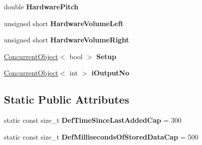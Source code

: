 \begin{DoxyCompactItemize}
\item 
\hypertarget{classcl_output_device_af51b846d3b4a11da3eefa8ccc4606132}{
double {\bfseries HardwarePitch}}
\label{classcl_output_device_af51b846d3b4a11da3eefa8ccc4606132}

\item 
\hypertarget{classcl_output_device_a12e78eba45422f2435aa0882eee979ac}{
unsigned short {\bfseries HardwareVolumeLeft}}
\label{classcl_output_device_a12e78eba45422f2435aa0882eee979ac}

\item 
\hypertarget{classcl_output_device_a1ff9989367b80682c33c815e548b206a}{
unsigned short {\bfseries HardwareVolumeRight}}
\label{classcl_output_device_a1ff9989367b80682c33c815e548b206a}

\item 
\hypertarget{classcl_output_device_a13d39a4d2d8782de9e849e0da0c48f0a}{
\hyperlink{class_concurrent_object}{ConcurrentObject}$<$ bool $>$ {\bfseries Setup}}
\label{classcl_output_device_a13d39a4d2d8782de9e849e0da0c48f0a}

\item 
\hypertarget{classcl_output_device_a7fccddb644e682c7e206118fedff60e5}{
\hyperlink{class_concurrent_object}{ConcurrentObject}$<$ int $>$ {\bfseries iOutputNo}}
\label{classcl_output_device_a7fccddb644e682c7e206118fedff60e5}

\end{DoxyCompactItemize}
\subsection*{Static Public Attributes}
\begin{DoxyCompactItemize}
\item 
\hypertarget{classcl_output_device_a6f4d941032e422926213833b01bfe08b}{
static const size\_\-t {\bfseries DefTimeSinceLastAddedCap} = 300}
\label{classcl_output_device_a6f4d941032e422926213833b01bfe08b}

\item 
\hypertarget{classcl_output_device_a5b0659aed4b5deb8cbe1139c2587465d}{
static const size\_\-t {\bfseries DefMillisecondsOfStoredDataCap} = 500}
\label{classcl_output_device_a5b0659aed4b5deb8cbe1139c2587465d}

\end{DoxyCompactItemize}
